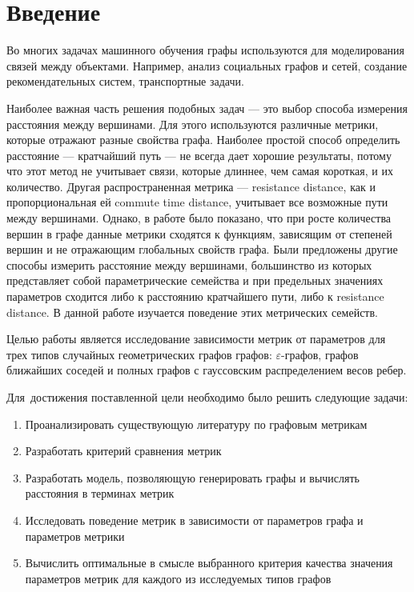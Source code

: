 \chapter*{Введение}							%

Во многих задачах машинного обучения графы используются для моделирования связей между объектами. Например, анализ социальных графов и сетей, создание рекомендательных систем, транспортные задачи.

Наиболее важная часть решения подобных задач --- это выбор способа измерения расстояния между вершинами. Для этого используются различные метрики, которые отражают разные свойства графа. Наиболее простой способ определить расстояние --- кратчайший путь --- не всегда дает хорошие результаты, потому что этот метод не учитывает связи, которые длиннее, чем самая короткая, и их количество. Другая распространенная метрика --- resistance distance, как и пропорциональная ей commute time distance, учитывает все возможные пути между вершинами. Однако, в работе \cite{von2014hitting} было показано, что при росте количества вершин в графе данные метрики сходятся к функциям, зависящим от степеней вершин и не отражающим глобальных свойств графа. Были предложены другие способы измерить расстояние между вершинами, большинство из которых представляет собой параметрические семейства и при предельных значениях параметров сходится либо к расстоянию кратчайшего пути, либо к resistance distance. В данной работе изучается поведение этих метрических семейств.

Целью работы является исследование зависимости метрик от параметров для трех типов случайных геометрических графов графов:  $\varepsilon$-графов, графов ближайших соседей и полных графов с гауссовским распределением весов ребер.

Для~достижения поставленной цели необходимо было решить следующие задачи:
\begin{enumerate}
  \item Проанализировать существующую литературу по графовым метрикам  
  \item Разработать критерий сравнения метрик
  \item Разработать модель, позволяющую генерировать графы и вычислять расстояния в терминах метрик   
  \item Исследовать поведение метрик в зависимости от параметров графа и параметров метрики
  \item Вычислить оптимальные в смысле выбранного критерия качества значения параметров метрик для каждого из исследуемых типов графов
\end{enumerate}



\clearpage